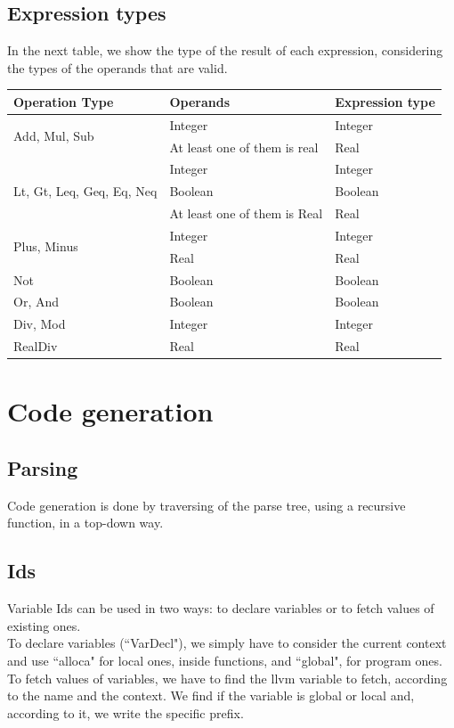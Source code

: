 \documentclass[12pt]{article}
\begin{document}
\subsection{Expression types}

In the next table, we show the type of the result of each expression, considering the types of the operands that are valid. \\

\begin{tabularx} {\textwidth} {|X|X|X|} 
 \textbf{Operation Type} 	& \textbf{Operands} & \textbf{Expression type} \\ \hline
	\multirow{2}{*}{Add, Mul, Sub} 	& Integer & Integer \\ \cline{2-3}
									& At least one of them is real & Real \\ \hline
	\multirow{3}{*}{Lt, Gt, Leq, Geq, Eq, Neq} 	& Integer & Integer \\ \cline{2-3}
												& Boolean & Boolean \\ \cline{2-3}
												& At least one of them is Real & Real \\ \hline
	\multirow{2}{*}{Plus, Minus} 				& Integer & Integer \\ \cline{2-3}
												& Real & Real \\ \hline
	Not & Boolean & Boolean \\ \hline
	Or, And & Boolean & Boolean \\ \hline
	Div, Mod & Integer & Integer \\ \hline
	RealDiv & Real & Real \\ \hline
	

\end{tabularx}

\newpage

\section{Code generation}

\subsection{Parsing}
Code generation is done by traversing of the parse tree, using a recursive function, in a top-down way. 

\subsection{Ids}
Variable Ids can be used in two ways: to declare variables or to fetch values of existing ones. \\
To declare variables (``VarDecl"), we simply have to consider the current context and use ``alloca" for local ones, inside functions, and ``global", for program ones. \\
To fetch values of variables, we have to find the llvm variable to fetch, according to the name and the context. We find if the variable is global or local and, according to it, we write the specific prefix.
\end{document}
